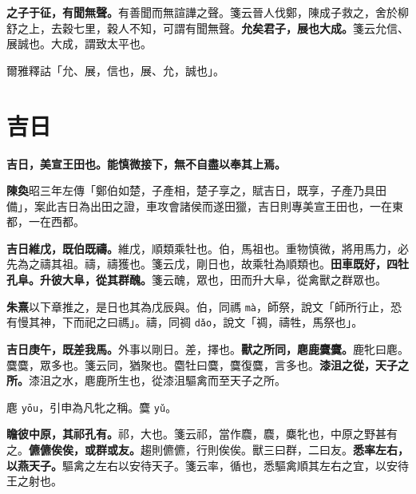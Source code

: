 \textbf{之子于征，有聞無聲。}{\footnotesize 有善聞而無諠譁之聲。箋云晉人伐鄭，陳成子救之，舍於柳舒之上，去穀七里，穀人不知，可謂有聞無聲。}\textbf{允矣君子，展也大成。}{\footnotesize 箋云允信、展誠也。大成，謂致太平也。}

\begin{quoting}爾雅釋詁「允、展，信也，展、允，誠也」。\end{quoting}

\section{吉日}


\textbf{吉日，美宣王田也。能慎微接下，無不自盡以奉其上焉。}

\begin{quoting}\textbf{陳奐}昭三年左傳「鄭伯如楚，子產相，楚子享之，賦吉日，既享，子產乃具田備」，案此吉日為出田之證，車攻會諸侯而遂田獵，吉日則專美宣王田也，一在東都，一在西都。\end{quoting}

\textbf{吉日維戊，既伯既禱。}{\footnotesize 維戊，順類乘牡也。伯，馬祖也。重物慎微，將用馬力，必先為之禱其祖。禱，禱獲也。箋云戊，剛日也，故乘牡為順類也。}\textbf{田車既好，四牡孔阜。升彼大阜，從其群醜。}{\footnotesize 箋云醜，眾也，田而升大阜，從禽獸之群眾也。}

\begin{quoting}\textbf{朱熹}以下章推之，是日也其為戊辰與。伯，同禡 \texttt{mà}，師祭，說文「師所行止，恐有慢其神，下而祀之曰禡」。禱，同禂 \texttt{dǎo}，說文「禂，禱牲，馬祭也」。\end{quoting}

\textbf{吉日庚午，既差我馬。}{\footnotesize 外事以剛日。差，擇也。}\textbf{獸之所同，麀鹿麌麌。}{\footnotesize 鹿牝曰麀。麌麌，眾多也。箋云同，猶聚也。麕牡曰麌，麌復麌，言多也。}\textbf{漆沮之從，天子之所。}{\footnotesize 漆沮之水，麀鹿所生也，從漆沮驅禽而至天子之所。}

\begin{quoting}麀 \texttt{yōu}，引申為凡牝之稱。麌 \texttt{yǔ}。\end{quoting}

\textbf{瞻彼中原，其祁孔有。}{\footnotesize 祁，大也。箋云祁，當作麎，麎，麋牝也，中原之野甚有之。}\textbf{儦儦俟俟，或群或友。}{\footnotesize 趨則儦儦，行則俟俟。獸三曰群，二曰友。}\textbf{悉率左右，以燕天子。}{\footnotesize 驅禽之左右以安待天子。箋云率，循也，悉驅禽順其左右之宜，以安待王之射也。}

